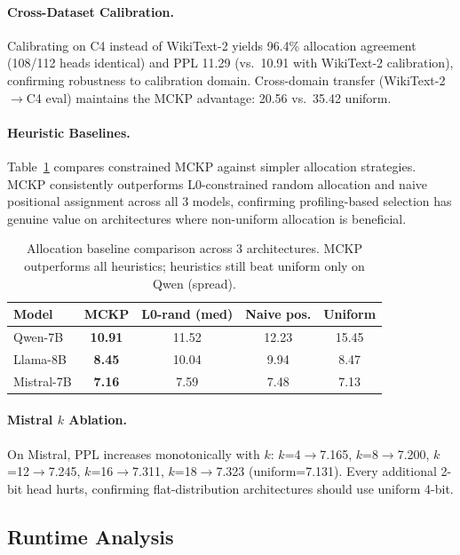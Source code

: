 \documentclass[11pt,a4paper]{article}
\begin{document}
\paragraph{Cross-Dataset Calibration.}
Calibrating on C4 instead of WikiText-2 yields 96.4\% allocation agreement (108/112 heads identical) and PPL 11.29 (vs.\ 10.91 with WikiText-2 calibration), confirming robustness to calibration domain.
Cross-domain transfer (WikiText-2$\to$C4 eval) maintains the MCKP advantage: 20.56 vs.\ 35.42 uniform.

\paragraph{Heuristic Baselines.}
Table~\ref{tab:heuristics} compares constrained MCKP against simpler allocation strategies.
MCKP consistently outperforms L0-constrained random allocation and naive positional assignment across all 3 models, confirming profiling-based selection has genuine value on architectures where non-uniform allocation is beneficial.

\begin{table}[t]
\centering
\small
\caption{Allocation baseline comparison across 3 architectures. MCKP outperforms all heuristics; heuristics still beat uniform only on Qwen (spread).}
\label{tab:heuristics}
\begin{tabular}{@{}lcccc@{}}
\toprule
\textbf{Model} & \textbf{MCKP} & \textbf{L0-rand (med)} & \textbf{Naive pos.} & \textbf{Uniform} \\
\midrule
Qwen-7B & \textbf{10.91} & 11.52 & 12.23 & 15.45 \\
Llama-8B & \textbf{8.45} & 10.04 & 9.94 & 8.47 \\
Mistral-7B & \textbf{7.16} & 7.59 & 7.48 & 7.13 \\
\bottomrule
\end{tabular}
\end{table}


\paragraph{Mistral $k$ Ablation.}
On Mistral, PPL increases monotonically with $k$: $k$=4$\to$7.165, $k$=8$\to$7.200, $k$=12$\to$7.245, $k$=16$\to$7.311, $k$=18$\to$7.323 (uniform=7.131).
Every additional 2-bit head hurts, confirming flat-distribution architectures should use uniform 4-bit.

\subsection{Runtime Analysis}
\label{sec:runtime}
\end{document}
